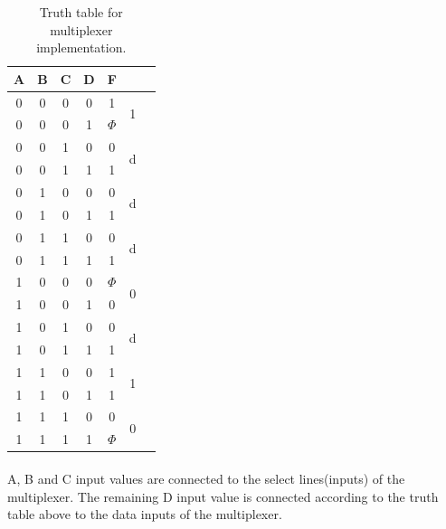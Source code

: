 \documentclass[pdftex,12pt,a4paper]{article}
\begin{document}
\begin{flushleft}
\begin{table}
\centering
    \begin{tabular}{|c|c|c|c|c|c|c|}
    \hline
         A & B & C & D & F &     \\
         \hline
         0 & 0 & 0 & 0 & 1 & \multirow{2}{1em}{1} \\
         0 & 0 & 0 & 1 & ${\Phi}$ & \\
         \hline
         0 & 0 & 1 & 0 & 0 & \multirow{2}{1em}{d}\\
         0 & 0 & 1 & 1 & 1 & \\
         \hline
         0 & 1 & 0 & 0 & 0 & \multirow{2}{1em}{d}\\
         0 & 1 & 0 & 1 & 1 & \\
         \hline
         0 & 1 & 1 & 0 & 0 & \multirow{2}{1em}{d}\\
         0 & 1 & 1 & 1 & 1 & \\
         \hline
         1 & 0 & 0 & 0 & ${\Phi}$ & \multirow{2}{1em}{0} \\
         1 & 0 & 0 & 1 & 0 & \\
         \hline
         1 & 0 & 1 & 0 & 0 & \multirow{2}{1em}{d}\\
         1 & 0 & 1 & 1 & 1 & \\
         \hline
         1 & 1 & 0 & 0 & 1 & \multirow{2}{1em}{1}\\
         1 & 1 & 0 & 1 & 1 & \\
         \hline
         1 & 1 & 1 & 0 & 0 & \multirow{2}{1em}{0}\\
         1 & 1 & 1 & 1 & ${\Phi}$ & \\
         \hline
    \end{tabular}
    \caption{Truth table for multiplexer implementation.}
    \label{truthtablep3}

\end{table}


\paragraph{}
A, B and C input values are connected to the select lines(inputs) of the multiplexer. The remaining D input value is connected according to the truth table above to the data inputs of the multiplexer.









\end{flushleft}
\end{document}
